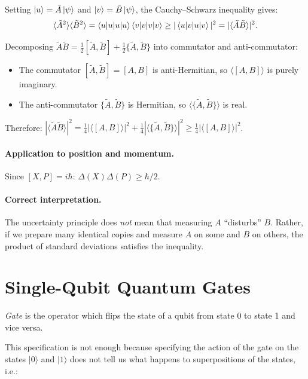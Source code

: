 \documentclass[10pt,a4paper]{article}
\begin{document}
Setting $\ket{u}=\tilde{A}\ket{\psi}$ and $\ket{v}=\tilde{B}\ket{\psi}$, the Cauchy--Schwarz inequality gives:
\[
\langle\tilde{A}^2\rangle\langle\tilde{B}^2\rangle = \braket{u|u}\braket{v|v} \ge |\braket{u|v}|^2 = |\langle\tilde{A}\tilde{B}\rangle|^2.
\]

Decomposing $\tilde{A}\tilde{B}=\frac{1}{2}[\tilde{A},\tilde{B}]+\frac{1}{2}\{\tilde{A},\tilde{B}\}$ into commutator and anti-commutator:
\begin{itemize}[nosep]
\item The commutator $[\tilde{A},\tilde{B}]=[A,B]$ is anti-Hermitian, so $\langle[A,B]\rangle$ is purely imaginary.
\item The anti-commutator $\{\tilde{A},\tilde{B}\}$ is Hermitian, so $\langle\{\tilde{A},\tilde{B}\}\rangle$ is real.
\end{itemize}

Therefore: $|\langle\tilde{A}\tilde{B}\rangle|^2 = \frac{1}{4}|\langle[A,B]\rangle|^2 + \frac{1}{4}|\langle\{\tilde{A},\tilde{B}\}\rangle|^2 \ge \frac{1}{4}|\langle[A,B]\rangle|^2$.

\paragraph{Application to position and momentum.} Since $[X,P]=i\hbar$: $\Delta(X)\Delta(P)\ge\hbar/2$.

\paragraph{Correct interpretation.} The uncertainty principle does \emph{not} mean that measuring $A$ ``disturbs'' $B$. Rather, if we prepare many identical copies and measure $A$ on some and $B$ on others, the product of standard deviations satisfies the inequality.

\newpage
\section{Single-Qubit Quantum Gates}
\textit{Gate} is the operator which flips the state of a qubit from state 0 to state 1 and vice versa.

This specification is not enough because specifying the action of the gate on the states \(|0\rangle\) and \(|1\rangle\) does not tell us what happens to superpositions of the states, i.e.:
\end{document}
